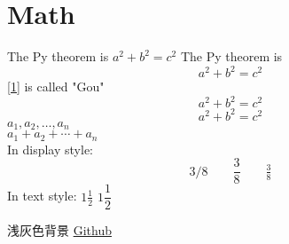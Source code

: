 \documentclass[cn,hazy,blue,11pt,screen]{elegantnote}
\begin{document}
\section{Math}
The Py theorem is $a^2 + b^2 = c^2$
The Py theorem is
\begin{equation}
   a^2 + b^2 = c^2\label{1}
\end{equation}
\eqref{1} is called "Gou"
\begin{equation}
   a^2 + b^2 = c^2\tag{yes}
\end{equation}
\[a^2 + b^2 = c^2\]
$a_1, a_2, \dots, a_n$\\
$a_1 + a_2 + \cdots + a_n$\\
In display style:
\[
  3/8 \qquad \frac{3}{8}
  \qquad \tfrac{3}{8}
\]
In text style:
$1\frac{1}{2}$
$1\dfrac{1}{2}$

\colorbox[gray]{0.95}{浅灰色背景}
\href{http://github.com}{Github}
\end{document}
